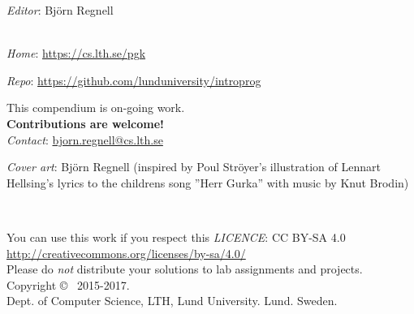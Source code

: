
\clearpage\null\thispagestyle{empty}
\vfill

{
\setlength{\parindent}{0pt}
\emph{Editor}: Björn Regnell \\ 


\\ \newline

\emph{Home}: \url{https://cs.lth.se/pgk} \newline

\emph{Repo}: \url{https://github.com/lunduniversity/introprog} \\ \newline

This compendium is on-going work. \\ \textbf{Contributions are welcome!} \\ 
\emph{Contact}: \url{bjorn.regnell@cs.lth.se}
\\ \newline

\emph{Cover art}: Björn Regnell (inspired by Poul Ströyer's illustration of Lennart Hellsing's lyrics to  the childrens song ''Herr Gurka'' with music by Knut Brodin)\\ \newline

~\\ \newline

You can use this work if you respect this \emph{LICENCE}: CC BY-SA 4.0 \\
\url{http://creativecommons.org/licenses/by-sa/4.0/} \\
Please do \emph{not} distribute your solutions to lab assignments and projects. 
\\ \newline
Copyright \copyright~ 2015-2017. \\
Dept. of Computer Science, LTH, Lund University. Lund. Sweden.\\
}